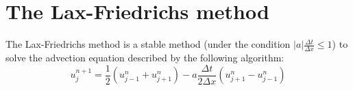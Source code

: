 \documentclass[11pt,a4paper]{article}
\begin{document}
\section{The Lax-Friedrichs method}
The Lax-Friedrichs method is a stable method (under the condition $|a|\frac{\Delta t}{\Delta x} \leq 1$) to solve the advection equation described by the following algorithm:
\begin{equation}
u_j^{n+1} = \frac{1}{2} (u_{j-1}^n + u_{j+1}^n) - a\frac{\Delta t}{2\Delta x}(u_{j+1}^n - u_{j-1}^n)
\end{equation}
\begin{figure}[!h]
\centering
{}
\subfigure[$u(x,t=10)$ with $c_f=1$]

\end{figure}
\end{document}
